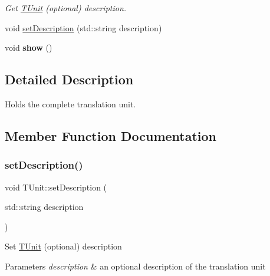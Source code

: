 \begin{DoxyCompactItemize}
\begin{DoxyCompactList}\small\item\em Get \hyperlink{classspan_1_1ir_1_1tunit_1_1TUnit}{T\+Unit} (optional) description. \end{DoxyCompactList}\item 
void \hyperlink{classspan_1_1ir_1_1tunit_1_1TUnit_a74ebf1c50b498f8117a9fd9257ad501d}{set\+Description} (std\+::string description)
\item 
\mbox{\label{classspan_1_1ir_1_1tunit_1_1TUnit_aadc76e7e08bf3b9a0f8be5a7ef339783}} 
void {\bfseries show} ()
\end{DoxyCompactItemize}


\subsection{Detailed Description}
Holds the complete translation unit. 

\subsection{Member Function Documentation}
\mbox{\label{classspan_1_1ir_1_1tunit_1_1TUnit_a7282396b2197abecf4be7b83232de887}} 
\subsubsection{\texorpdfstring{set\+Description()}{setDescription()}\hspace{0.1cm}{\footnotesize\ttfamily [1/2]}}
{\footnotesize\ttfamily void T\+Unit\+::set\+Description (\begin{DoxyParamCaption}\item[{std\+::string}]{description }\end{DoxyParamCaption})}

Set \hyperlink{classspan_1_1ir_1_1tunit_1_1TUnit}{T\+Unit} (optional) description 
\begin{DoxyParams}{Parameters}
{\em description} & an optional description of the translation unit \\
\hline
\end{DoxyParams}
\mbox{\label{classspan_1_1ir_1_1tunit_1_1TUnit_a74ebf1c50b498f8117a9fd9257ad501d}} 
